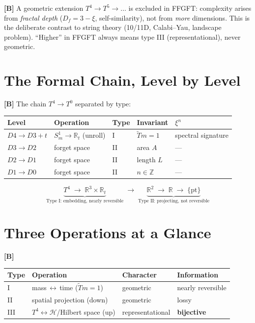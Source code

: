 \textbf{[B]} A geometric extension $T^4\to T^5\to\dots$ is excluded in FFGFT:
complexity arises from \emph{fractal depth} ($D_f=3-\xi$, self-similarity), not
from \emph{more} dimensions. This is the deliberate contrast to string theory
(10/11D, Calabi--Yau, landscape problem). ``Higher'' in FFGFT always means type
III (representational), never geometric.

\section{The Formal Chain, Level by Level}

\textbf{[B]} The chain $T^4\to T^0$ separated by type:

\begin{center}
\renewcommand{\arraystretch}{1.35}
{\small
\begin{tabular}{lllll}
\toprule
\textbf{Level} & \textbf{Operation} & \textbf{Type} & \textbf{Invariant} & \textbf{$\xi^n$} \\
\midrule
$D4\to D3{+}t$ & $S^1_m\to\mathbb{R}_t$ (unroll) & I & $\tilde Tm=1$ & spectral signature \\
$D3\to D2$ & forget space & II & area $A$ & --- \\
$D2\to D1$ & forget space & II & length $L$ & --- \\
$D1\to D0$ & forget space & II & $n\in\mathbb{Z}$ & --- \\
\bottomrule
\end{tabular}
}
\renewcommand{\arraystretch}{1.0}
\end{center}

\[
\underbrace{T^4\;\longrightarrow\;\mathbb{R}^3\times\mathbb{R}_t}_{\text{Type I: embedding, nearly reversible}}
\;\longrightarrow\;
\underbrace{\mathbb{R}^2\;\longrightarrow\;\mathbb{R}\;\longrightarrow\;\{\mathrm{pt}\}}_{\text{Type II: projecting, not reversible}}
\]

\section{Three Operations at a Glance}

\textbf{[B]}
\begin{center}
\renewcommand{\arraystretch}{1.35}
{\small
\begin{tabular}{llll}
\toprule
\textbf{Type} & \textbf{Operation} & \textbf{Character} & \textbf{Information} \\
\midrule
I & mass$\,\leftrightarrow\,$time ($\tilde Tm=1$) & geometric & nearly reversible \\
II & spatial projection (down) & geometric & lossy \\
III & $T^4\leftrightarrow\mathcal H$/Hilbert space (up) & representational & \textbf{bijective} \\
\bottomrule
\end{tabular}
}
\renewcommand{\arraystretch}{1.0}
\end{center}

